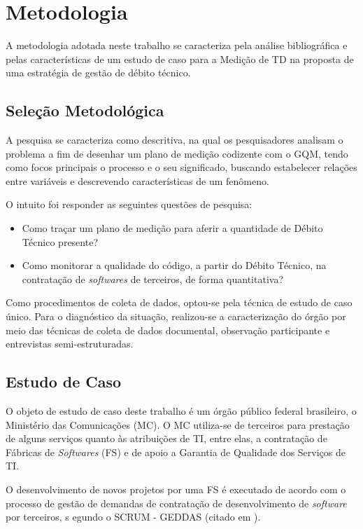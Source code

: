\chapter[Metodologia]{Metodologia}
A metodologia adotada neste trabalho se caracteriza pela análise bibliográfica e
pelas características de um estudo de caso para a Medição de TD na proposta de
\cite{td} uma estratégia de gestão de débito técnico.

\section{Seleção Metodológica}
A pesquisa se caracteriza como descritiva, na qual os pesquisadores analisam o problema
a fim de desenhar um plano de medição codizente com o GQM, tendo como focos
principais o processo e o seu significado,
buscando estabelecer relações entre variáveis e descrevendo características de
um fenômeno.

O intuito foi responder as seguintes questões de pesquisa:

\begin{itemize}
  \item Como traçar um plano de medição para aferir a quantidade de Débito Técnico
  presente?

  \item Como monitorar a qualidade do código, a partir do Débito Técnico, na
  contratação de \textit{softwares} de terceiros, de forma quantitativa?
\end{itemize}

Como procedimentos de coleta de dados, optou-se pela técnica de estudo de caso
único. Para o diagnóstico da situação, realizou-se a caracterização do órgão por
meio das técnicas de coleta de dados documental, observação participante e
entrevistas semi-estruturadas.

\section{Estudo de Caso}
O objeto de estudo de caso deste trabalho é um órgão público federal brasileiro,
o Ministério das Comunicações (MC). O MC utiliza-se de terceiros para prestação
de alguns serviços quanto às atribuições de TI, entre elas, a contratação de
Fábricas de \textit{Softwares} (FS) e de apoio a Garantia de Qualidade dos Serviços de TI.

O desenvolvimento de novos projetos por uma FS é executado de acordo com o processo
de gestão de demandas de contratação de desenvolvimento de \textit{software} por terceiros, s
egundo o SCRUM - GEDDAS (citado em \cite{souza}).

